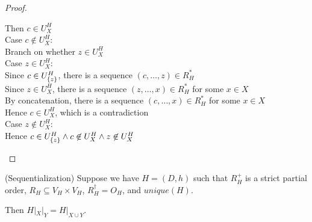 \begin{proof}
\begin{tabbedproof}
\ooooo Then $c \in U^H_{X}$ \\
\oooo Case $c \not\in U^H_{X}$: \\
\ooooo Branch on whether $z \in U^H_{X}$ \\
\ooooo Case $z \in U^H_{X}$: \\
\oooooo Since $c \in U^H_{\{{z}\}}$, there is a sequence $(c, \ldots, z) \in R^*_H$ \\
\oooooo Since $z \in U^H_{X}$, there is a sequence $(z, \ldots, x) \in R^*_H$ for some $x \in X$ \\
\oooooo By concatenation, there is a sequence $(c, \ldots, x) \in R^*_H$ for some  $x \in X$ \\
\oooooo Hence $c \in U^H_{X}$, which is a contradiction \\
\ooooo Case $z \not\in U^H_{X}$: \\
\oooooo Hence $c \in U^H_{\{{z}\}} \land c \not\in U^H_{X} \land z \not\in U^H_{X}$ \\
\end{tabbedproof}
\end{proof}

\begin{lemma}{(Sequentialization)}
Suppose we have $H = (D,h)$ such that $R^+_H$ is a strict partial
order, $R_H \subseteq V_H \times V_H$, $R^\dagger_H = O_H$, and
$\mathit{unique}(H)$.

Then $H|_X|_Y = H|_{X \cup Y}$.
\end{lemma}

